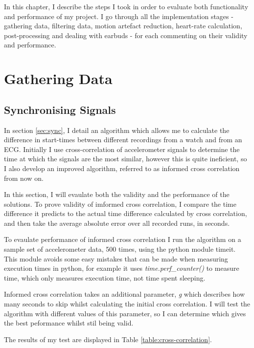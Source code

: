 \documentclass[12pt,a4paper,twoside,openright]{report}
\begin{document}
In this chapter, I describe the steps I took in order to evaluate both
functionality and performance of my project. I go through all the
implementation stages - gathering data, filtering data, motion artefact
reduction, heart-rate calculation, post-processing and dealing with earbuds -
for each commenting on their validity and performance.

\section{Gathering Data}

\subsection{Synchronising Signals} \label{sec:evaluate-sync}

In section \ref{sec:sync}, I detail an algorithm which allows me to
calculate the difference in start-times between different recordings from a
watch and from an ECG. Initially I use cross-correlation of accelerometer signals to
determine the time at which the signals are the most similar, however this is
quite ineficient, so I also develop an improved algorithm, referred to as
informed cross correlation from now on.

In this section, I will evaulate both the validity and the performance of the
solutions. To prove validity of imformed cross correlation, I compare the
time difference it predicts to the actual time difference calculated by cross
correlation, and then take the average absolute error over all recorded runs,
in seconds. 

To evaulate performance of informed cross correlation I run the
algorithm on a sample set of accelerometer data, 500 times, using the python
module timeit. This module avoids some easy mistakes that can be made when
measuring execution times in python, for example it uses
\emph{time.perf\_counter()} to measure time, which only measures execution
time, not time spent sleeping.

Informed cross correlation takes an additional parameter,
\emph{g} which describes how many seconds to skip whilst
calculating the initial cross correlation. I will test the algorithm with different
values of this parameter, so I can determine which gives the best peformance
whilst stil being valid. 

The results of my test are displayed in Table \ref{table:cross-correlation}. 
\end{document}
